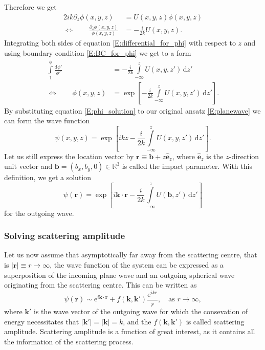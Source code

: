 \documentclass[a4paper, twoside, english, 12pt]{article}
\begin{document}
Therefore we get 
\begin{align}\label{E:differential_for_phi}
	2ik\partial_z\phi(x,y,z) &= U(x,y,z)\phi(x,y,z) \nonumber\\
\iff \qquad	\frac{\partial_z\phi(x,y,z)}{\phi(x,y,z)} &= -\frac{i}{2k}U(x,y,z).
\end{align}
Integrating both sides of equation \eqref{E:differential_for_phi} with respect to $z$ and using boundary condition \eqref{E:BC_for_phi} we get to a form
\begin{align}\label{E:phi_solution}
	\int\limits^{\phi}_{1}\frac{\text{d}\phi'}{\phi'} &= -\frac{i}{2k}\int\limits^{z}_{-\infty} U(x,y,z')\,\text{d}z' \nonumber\\
\iff \qquad	\phi(x,y,z) &= \exp\left[-\frac{i}{2k}\int\limits^{z}_{-\infty} U(x,y,z')\,\text{d}z'\right].
\end{align}
By substituting equation \eqref{E:phi_solution} to our original ansatz \eqref{E:planewave} we can form the wave function
\begin{equation}\label{E:wave_function_solution_xyz}
	\psi(x,y,z) = \exp\left[ikz-\frac{i}{2k}\int\limits^{z}_{-\infty} U(x,y,z')\,\text{d}z'\right].
\end{equation}
Let us still express the location vector by $\mathbf{r}\equiv \mathbf{b}+z\hat{\mathbf{e}}_z$, where $\hat{\mathbf{e}}_z$ is the $z$-direction unit vector and $\mathbf{b}=(b_x,b_y,0)\in\mathbb{R}^3$ is called the impact parameter. With this definition, we get a solution
\begin{equation}\label{E:wave_function_solution}
	\psi(\mathbf{r}) = \exp\left[i\mathbf{k}\cdot\mathbf{r}-\frac{i}{2k}\int\limits^{z}_{-\infty} U(\mathbf{b},z')\,\text{d}z'\right]
\end{equation}
for the outgoing wave.



\subsubsection{Solving scattering amplitude}\label{SS:scatt_amplitude}

Let us now assume that asymptotically far away from the scattering centre, that is $|\mathbf{r}|\equiv r\rightarrow\infty$, the wave function of the system can be expressed as a superposition of the incoming plane wave and an outgoing spherical wave originating from the scattering centre. This can be written as
\begin{equation}\label{E:asymptotical_wave_function}		
	\psi(\mathbf{r}) \sim \text{e}^{i\mathbf{k}\cdot\mathbf{r}} + f(\mathbf{k},\mathbf{k'})\frac{\text{e}^{ikr}}{r}, \quad \text{as} \,\, r\rightarrow\infty,
\end{equation}
where $\mathbf{k'}$ is the wave vector of the outgoing wave for which the consevation of energy necessitates that $|\mathbf{k'}|=|\mathbf{k}|=k$, and the $f(\mathbf{k},\mathbf{k'})$ is called scattering amplitude. Scattering amplitude is a function of great interest, as it contains all the information of the scattering process. 
\end{document}
